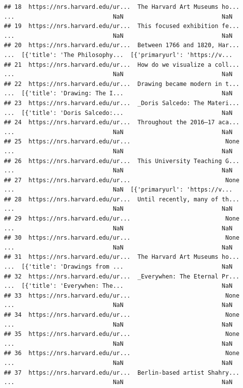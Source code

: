 \documentclass[]{book}
\begin{document}
\begin{verbatim}
## 18  https://nrs.harvard.edu/ur...  The Harvard Art Museums ho...  ...                            NaN                            NaN
## 19  https://nrs.harvard.edu/ur...  This focused exhibition fe...  ...                            NaN                            NaN
## 20  https://nrs.harvard.edu/ur...  Between 1766 and 1820, Har...  ...  [{'title': 'The Philosophy...  [{'primaryurl': 'https://v...
## 21  https://nrs.harvard.edu/ur...  How do we visualize a coll...  ...                            NaN                            NaN
## 22  https://nrs.harvard.edu/ur...  Drawing became modern in t...  ...  [{'title': 'Drawing: The I...                            NaN
## 23  https://nrs.harvard.edu/ur...  _Doris Salcedo: The Materi...  ...  [{'title': 'Doris Salcedo:...                            NaN
## 24  https://nrs.harvard.edu/ur...  Throughout the 2016–17 aca...  ...                            NaN                            NaN
## 25  https://nrs.harvard.edu/ur...                           None  ...                            NaN                            NaN
## 26  https://nrs.harvard.edu/ur...  This University Teaching G...  ...                            NaN                            NaN
## 27  https://nrs.harvard.edu/ur...                           None  ...                            NaN  [{'primaryurl': 'https://v...
## 28  https://nrs.harvard.edu/ur...  Until recently, many of th...  ...                            NaN                            NaN
## 29  https://nrs.harvard.edu/ur...                           None  ...                            NaN                            NaN
## 30  https://nrs.harvard.edu/ur...                           None  ...                            NaN                            NaN
## 31  https://nrs.harvard.edu/ur...  The Harvard Art Museums ho...  ...  [{'title': 'Drawings from ...                            NaN
## 32  https://nrs.harvard.edu/ur...  _Everywhen: The Eternal Pr...  ...  [{'title': 'Everywhen: The...                            NaN
## 33  https://nrs.harvard.edu/ur...                           None  ...                            NaN                            NaN
## 34  https://nrs.harvard.edu/ur...                           None  ...                            NaN                            NaN
## 35  https://nrs.harvard.edu/ur...                           None  ...                            NaN                            NaN
## 36  https://nrs.harvard.edu/ur...                           None  ...                            NaN                            NaN
## 37  https://nrs.harvard.edu/ur...  Berlin-based artist Shahry...  ...                            NaN                            NaN

\end{verbatim}
\end{document}
